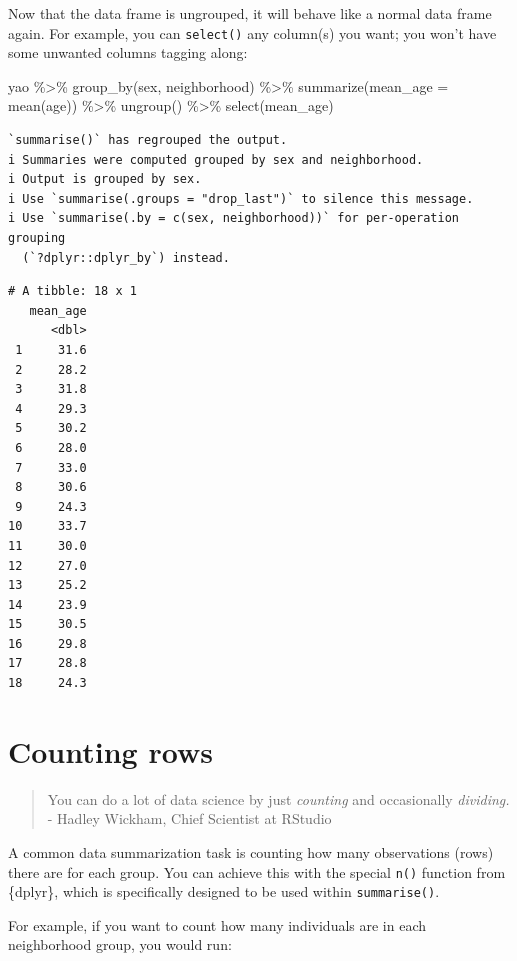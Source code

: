 \documentclass[
  letterpaper,
  DIV=11,
  numbers=noendperiod]{scrreprt}
\newenvironment{Shaded}{\begin{snugshade}}{\end{snugshade}}
\newcommand{\AttributeTok}[1]{\textcolor[rgb]{0.40,0.45,0.13}{#1}}
\newcommand{\FunctionTok}[1]{\textcolor[rgb]{0.28,0.35,0.67}{#1}}
\newcommand{\NormalTok}[1]{\textcolor[rgb]{0.00,0.23,0.31}{#1}}
\newcommand{\SpecialCharTok}[1]{\textcolor[rgb]{0.37,0.37,0.37}{#1}}
\begin{document}
Now that the data frame is ungrouped, it will behave like a normal data
frame again. For example, you can \texttt{select()} any column(s) you
want; you won't have some unwanted columns tagging along:

\begin{Shaded}
\begin{Highlighting}[]
\NormalTok{yao }\SpecialCharTok{\%\textgreater{}\%} 
  \FunctionTok{group\_by}\NormalTok{(sex, neighborhood) }\SpecialCharTok{\%\textgreater{}\%} 
  \FunctionTok{summarize}\NormalTok{(}\AttributeTok{mean\_age =} \FunctionTok{mean}\NormalTok{(age)) }\SpecialCharTok{\%\textgreater{}\%} 
  \FunctionTok{ungroup}\NormalTok{() }\SpecialCharTok{\%\textgreater{}\%} 
  \FunctionTok{select}\NormalTok{(mean\_age)}
\end{Highlighting}
\end{Shaded}

\begin{verbatim}
`summarise()` has regrouped the output.
i Summaries were computed grouped by sex and neighborhood.
i Output is grouped by sex.
i Use `summarise(.groups = "drop_last")` to silence this message.
i Use `summarise(.by = c(sex, neighborhood))` for per-operation grouping
  (`?dplyr::dplyr_by`) instead.
\end{verbatim}

\begin{verbatim}
# A tibble: 18 x 1
   mean_age
      <dbl>
 1     31.6
 2     28.2
 3     31.8
 4     29.3
 5     30.2
 6     28.0
 7     33.0
 8     30.6
 9     24.3
10     33.7
11     30.0
12     27.0
13     25.2
14     23.9
15     30.5
16     29.8
17     28.8
18     24.3
\end{verbatim}

\section{Counting rows}\label{counting-rows}

\begin{quote}
You can do a lot of data science by just \emph{counting} and
occasionally \emph{dividing.} - Hadley Wickham, Chief Scientist at
RStudio
\end{quote}

A common data summarization task is counting how many observations
(rows) there are for each group. You can achieve this with the special
\texttt{n()} function from \{dplyr\}, which is specifically designed to
be used within \texttt{summarise()}.

For example, if you want to count how many individuals are in each
neighborhood group, you would run:
\end{document}
